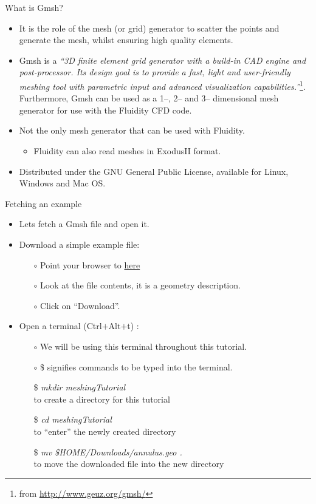 \documentclass[t]{beamer}
\begin{document}
\begin{frame}{What is Gmsh?}
\begin{itemize}
\item It is the role of the mesh (or grid) generator to scatter the points and generate the mesh, whilst ensuring high quality elements.
\item Gmsh is a \emph{``3D finite element grid generator with a build-in CAD engine and post-processor. Its design goal is to provide a fast, light and user-friendly meshing tool with parametric input and advanced visualization capabilities.''}\footnote{from \url{http://www.geuz.org/gmsh/}}. Furthermore, Gmsh can be used as a 1--, 2-- and 3-- dimensional mesh generator for use with the Fluidity CFD code.
\item Not the only mesh generator that can be used with Fluidity.
\begin{itemize}
   \item Fluidity can also read meshes in ExodusII format.
\end{itemize}
\item Distributed under the GNU General Public License, available for Linux, Windows and Mac OS.
\end{itemize}
\end{frame}

\begin{frame}{Fetching an example}
\begin{itemize}
   \item Lets fetch a Gmsh file and open it.
   \item Download a simple example file:
   \begin{itemize}
      \item[$\circ$] Point your browser to \href{http://figshare.com/s/b0936b565f8211e4aee906ec4b8d1f61}{here}
      \item[$\circ$] Look at the file contents, it is a geometry description.
      \item[$\circ$] Click on ``Download''.
   \end{itemize}\vspace{10pt}
   \item Open a terminal (Ctrl$+$Alt$+$t) :
   \begin{itemize}
      \item[$\circ$] We will be using this terminal throughout this tutorial.
      \item[$\circ$] \$ signifies commands to be typed into the terminal.
      \item[\$] \emph{mkdir meshingTutorial} \\to create a directory for this tutorial
      \item[\$] \emph{cd meshingTutorial} \\to ``enter'' the newly created directory
      \item[\$] \emph{mv \$HOME/Downloads/annulus.geo .} \\to move the downloaded file into the new directory
   \end{itemize}
\end{itemize}
\end{frame}
\end{document}

